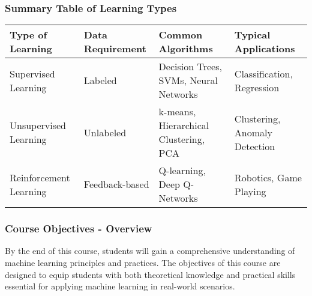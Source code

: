 \documentclass[aspectratio=169]{beamer}
\begin{document}
\begin{frame}[fragile]
    \frametitle{Summary Table of Learning Types}
    \begin{table}[ht]
        \centering
        \begin{tabular}{|l|l|l|l|}
            \hline
            \textbf{Type of Learning} & \textbf{Data Requirement} & \textbf{Common Algorithms} & \textbf{Typical Applications} \\
            \hline
            Supervised Learning & Labeled & Decision Trees, SVMs, Neural Networks & Classification, Regression \\
            \hline
            Unsupervised Learning & Unlabeled & k-means, Hierarchical Clustering, PCA & Clustering, Anomaly Detection \\
            \hline
            Reinforcement Learning & Feedback-based & Q-learning, Deep Q-Networks & Robotics, Game Playing \\
            \hline
        \end{tabular}
    \end{table}
\end{frame}

\begin{frame}
    \frametitle{Course Objectives - Overview}
    By the end of this course, students will gain a comprehensive understanding of machine learning principles and practices. The objectives of this course are designed to equip students with both theoretical knowledge and practical skills essential for applying machine learning in real-world scenarios.
\end{frame}
\end{document}
